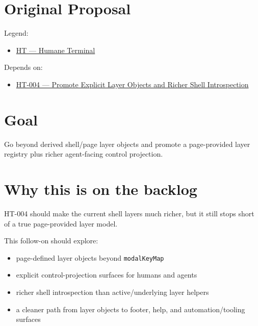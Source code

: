 \section{Original Proposal}\label{record-352-original-proposal}

Legend:

\begin{itemize}
\tightlist
\item
  \href{https://github.com/flyingrobots/bijou/blob/1853ad902f6bf219326409e7f743a5a1d6517dbc/docs/method/legends/HT-humane-terminal.md}{HT --- Humane Terminal}
\end{itemize}

Depends on:

\begin{itemize}
\tightlist
\item
  \href{https://github.com/flyingrobots/bijou/blob/cbd70612140e7a450d764b3c7be1c6af878b99bc/docs/method/design/HT-004-promote-explicit-layer-objects-and-richer-shell-introspection.md}{HT-004 --- Promote Explicit Layer Objects and Richer Shell Introspection}
\end{itemize}

\section{Goal}\label{record-352-goal}

Go beyond derived shell/page layer objects and promote a page-provided layer registry plus richer agent-facing control projection.

\section{Why this is on the backlog}\label{record-352-why-this-is-on-the-backlog}

HT-004 should make the current shell layers much richer, but it still stops short of a true page-provided layer model.

This follow-on should explore:

\begin{itemize}
\tightlist
\item
  page-defined layer objects beyond \texttt{m\allowbreak{}o\allowbreak{}d\allowbreak{}a\allowbreak{}l\allowbreak{}K\allowbreak{}e\allowbreak{}y\allowbreak{}M\allowbreak{}a\allowbreak{}p}
\item
  explicit control-projection surfaces for humans and agents
\item
  richer shell introspection than active/underlying layer helpers
\item
  a cleaner path from layer objects to footer, help, and automation/tooling surfaces
\end{itemize}

